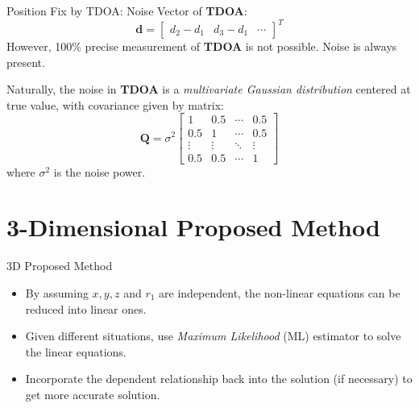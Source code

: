 \documentclass[10pt]{beamer}
\begin{document}
\begin{frame}{Position Fix by TDOA: Noise}
  Vector of \textbf{TDOA}:
    $$\mathbf{d} = \begin{bmatrix} d_2-d_1 & d_3-d_1 & \cdots \end{bmatrix}^{T}$$
  However, 100\% precise measurement of \textbf{TDOA} is not possible.
  Noise is always present.

  Naturally, the noise in \textbf{TDOA} is a \textit{multivariate Gaussian distribution}
  centered at true value, with covariance given by matrix:
    $$ \mathbf{Q} = \sigma^2
      \begin{bmatrix}
        1 & 0.5 & \cdots & 0.5 \\
        0.5 & 1 & \cdots & 0.5 \\
        \vdots & \vdots & \ddots & \vdots \\
        0.5 & 0.5 & \cdots & 1 \end{bmatrix}
    $$
    where $\sigma^2$ is the noise power.
\end{frame}

\section{3-Dimensional Proposed Method}

\begin{frame}{3D Proposed Method}
  \begin{itemize}[<+- | alert@+>]
    \item By assuming $x, y, z$ and $r_1$ are independent, the non-linear
          equations can be reduced into linear ones.

    \item Given different situations, use \emph{Maximum Likelihood} (ML)
          estimator to solve the linear equations.

    \item Incorporate the dependent relationship back into the solution (if necessary)
          to get more accurate solution.

  \end{itemize}
\end{frame}
\end{document}
